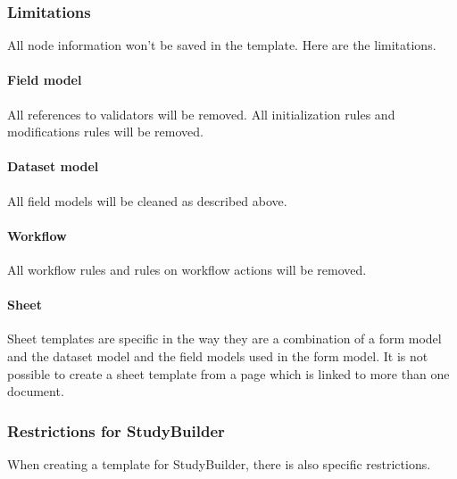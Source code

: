 \documentclass[11pt,a4paper,oneside]{article}
\begin{document}
\subsubsection{Limitations}
All node information won't be saved in the template. Here are the limitations.

\paragraph{Field model}
All references to validators will be removed. All initialization rules and modifications rules will be removed.

\paragraph{Dataset model}
All field models will be cleaned as described above.

\paragraph{Workflow}
All workflow rules and rules on workflow actions will be removed.

\paragraph{Sheet}
Sheet templates are specific in the way they are a combination of a form model and the dataset model and the field models used in the form model. It is not possible to create a sheet template from a page which is linked to more than one document.

\subsubsection{Restrictions for StudyBuilder}
When creating a template for StudyBuilder, there is also specific restrictions.
\end{document}
